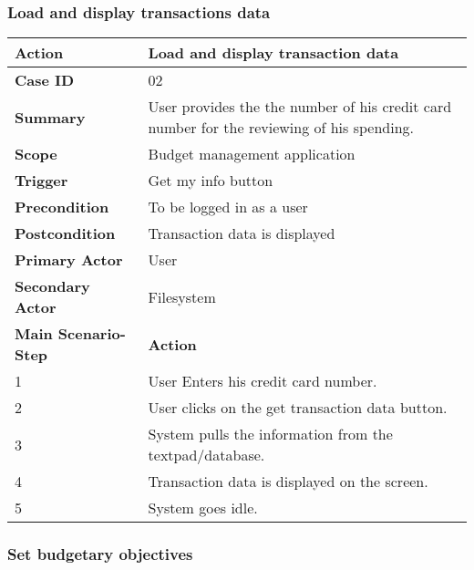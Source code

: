 \documentclass[letterpaper]{article}
\begin{document}
		\subsubsection{Load and display transactions data}
		
		\begin{center}
        \begin{tabular}{ | m{5cm} | m{10cm}| } 
            \hline
            \textbf{Action} & Load and display transaction data \\ 
            \hline
            \textbf{Case ID} & 02 \\ 
            \hline
            \textbf{Summary} & User provides the the number of his credit card number for the reviewing of his spending. \\
            \hline
            \textbf{Scope} & Budget management application \\ 
            \hline
            \textbf{Trigger} & Get my info button \\
            \hline
            \textbf{Precondition} & To be logged in as a user \\ 
            \hline
            \textbf{Postcondition} & Transaction data is displayed \\ 
            \hline
            \textbf{Primary Actor} & User \\ 
            \hline
            \textbf{Secondary Actor} & Filesystem \\ 
            \hline
            \textbf{Main Scenario-Step} & \textbf{Action} \\ 
            \hline
            1 & User Enters his credit card number. \\ 
            \hline
            2 & User clicks on the get transaction data button. \\ 
            \hline
            3 & System pulls the information from the textpad/database. \\ 
            \hline
            4 & Transaction data is displayed on the screen. \\ 
            \hline
            5 & System goes idle. \\ 
            \hline
        \end{tabular}
        \end{center}
        
		\subsubsection{Set budgetary objectives}
		
\end{document}
